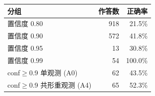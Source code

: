 \begin{tabular}{lrr}
\hline
分组 & 作答数 & 正确率 \\
\hline
置信度 0.80 & 918 & 21.5\% \\
置信度 0.90 & 572 & 41.8\% \\
置信度 0.95 & 13 & 30.8\% \\
置信度 0.99 & 54 & 100.0\% \\
\hline
conf$\ge$0.9 单观测 (A0) & 62 & 43.5\% \\
conf$\ge$0.9 共形重观测 (A4) & 65 & 52.3\% \\
\hline
\end{tabular}
